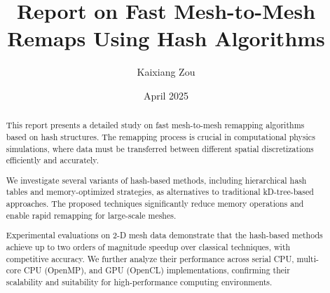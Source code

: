 \documentclass[12pt]{article}
\title{Report on Fast Mesh-to-Mesh Remaps Using Hash Algorithms}
\author{Kaixiang Zou}
\date{April 2025}
\begin{document}
\maketitle

\begin{abstract}
This report presents a detailed study on fast mesh-to-mesh remapping algorithms based on hash structures. The remapping process is crucial in computational physics simulations, where data must be transferred between different spatial discretizations efficiently and accurately.

We investigate several variants of hash-based methods, including hierarchical hash tables and memory-optimized strategies, as alternatives to traditional kD-tree-based approaches. The proposed techniques significantly reduce memory operations and enable rapid remapping for large-scale meshes.

Experimental evaluations on 2-D mesh data demonstrate that the hash-based methods achieve up to two orders of magnitude speedup over classical techniques, with competitive accuracy. We further analyze their performance across serial CPU, multi-core CPU (OpenMP), and GPU (OpenCL) implementations, confirming their scalability and suitability for high-performance computing environments.


\end{abstract}

\tableofcontents









\end{document}
